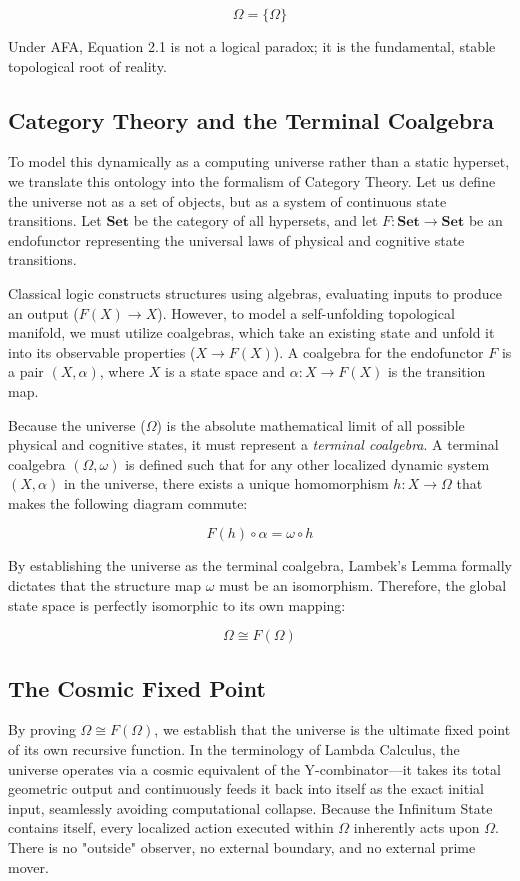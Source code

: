 \documentclass[12pt,openany]{book}
\begin{document}
\begin{equation}
\Omega = \{\Omega\}
\end{equation}

Under AFA, Equation 2.1 is not a logical paradox; it is the fundamental, stable topological root of reality.

\subsection{Category Theory and the Terminal Coalgebra}
To model this dynamically as a computing universe rather than a static hyperset, we translate this ontology into the formalism of Category Theory. Let us define the universe not as a set of objects, but as a system of continuous state transitions. Let $\mathbf{Set}$ be the category of all hypersets, and let $F: \mathbf{Set} \to \mathbf{Set}$ be an endofunctor representing the universal laws of physical and cognitive state transitions.

Classical logic constructs structures using algebras, evaluating inputs to produce an output ($F(X) \to X$). However, to model a self-unfolding topological manifold, we must utilize coalgebras, which take an existing state and unfold it into its observable properties ($X \to F(X)$). A coalgebra for the endofunctor $F$ is a pair $(X, \alpha)$, where $X$ is a state space and $\alpha: X \to F(X)$ is the transition map.

Because the universe ($\Omega$) is the absolute mathematical limit of all possible physical and cognitive states, it must represent a \textit{terminal coalgebra}. A terminal coalgebra $(\Omega, \omega)$ is defined such that for any other localized dynamic system $(X, \alpha)$ in the universe, there exists a unique homomorphism $h: X \to \Omega$ that makes the following diagram commute:

\begin{equation}
F(h) \circ \alpha = \omega \circ h
\end{equation}

By establishing the universe as the terminal coalgebra, Lambek's Lemma formally dictates that the structure map $\omega$ must be an isomorphism. Therefore, the global state space is perfectly isomorphic to its own mapping:

\begin{equation}
\Omega \cong F(\Omega)
\end{equation}

\subsection{The Cosmic Fixed Point}
By proving $\Omega \cong F(\Omega)$, we establish that the universe is the ultimate fixed point of its own recursive function. In the terminology of Lambda Calculus, the universe operates via a cosmic equivalent of the Y-combinator---it takes its total geometric output and continuously feeds it back into itself as the exact initial input, seamlessly avoiding computational collapse. Because the Infinitum State contains itself, every localized action executed within $\Omega$ inherently acts upon $\Omega$. There is no "outside" observer, no external boundary, and no external prime mover.
\end{document}
